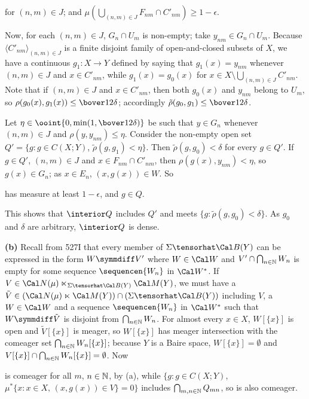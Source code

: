 {

\noindent for $(n,m)\in J$; and
$\mu(\bigcup_{(n,m)\in J}F_{nm}\cap C'_{nm})\ge 1-\epsilon$.

Now, for each $(n,m)\in J$, $G_n\cap U_m$ is non-empty;  take
$y_{nm}\in G_n\cap U_m$.
Because $\langle C'_{nm}\rangle_{(n,m)\in J}$ is a finite disjoint family of
open-and-closed subsets of $X$, we have a continuous $g_1:X\to Y$ defined by saying
that $g_1(x)=y_{nm}$ whenever $(n,m)\in J$ and $x\in C'_{nm}$, while $g_1(x)=g_0(x)$
for $x\in X\setminus\bigcup_{(n,m)\in J}C'_{nm}$.   Note that if $(n,m)\in J$ and
$x\in C'_{nm}$, then both $g_0(x)$ and $y_{nm}$ belong to $U_m$, so
$\rho(g_0(x),g_1(x))\le\bover12\delta$;  accordingly
$\tilde\rho(g_0,g_1)\le\bover12\delta$.

Let $\eta\in\ooint{0,\min(1,\bover12\delta)}$ be such that
$y\in G_n$ whenever
$(n,m)\in J$ and $\rho(y,y_{nm})\le\eta$.   Consider the non-empty
open set $Q'=\{g:g\in C(X;Y)$, $\tilde\rho(g,g_1)<\eta\}$.
Then $\tilde\rho(g,g_0)<\delta$ for every $g\in Q'$.
If $g\in Q'$, $(n,m)\in J$ and $x\in F_{nm}\cap C'_{nm}$, then
$\rho(g(x),y_{nm})<\eta$, so $g(x)\in G_n$;  as $x\in E_n$, $(x,g(x))\in W$.
So


\noindent has measure at least $1-\epsilon$, and $g\in Q$.

This shows that $\interior Q$ includes $Q'$ and meets
$\{g:\tilde\rho(g,g_0)<\delta\}$.   As $g_0$ and $\delta$ are arbitrary, $\interior Q$
is dense.\ \Qed

\medskip

{\bf (b)} Recall from 527I that every member of
$\Sigma\tensorhat\Cal B(Y)$ can be
expressed in the form $W\symmdiff V'$ where $W\in\Cal W$ and
$V'\cap\bigcap_{n\in\Bbb N}W_n$ is empty for some sequence
$\sequencen{W_n}$ in $\Cal W^*$.   If
$V\in\Cal N(\mu)\ltimes_{\Sigma\tensorhat\Cal B(Y)}\Cal M(Y)$, we must have
a $\tilde V\in(\Cal N(\mu)\ltimes\Cal M(Y))\cap(\Sigma\tensorhat\Cal B(Y))$
including $V$, a $W\in\Cal W$ and a sequence $\sequencen{W_n}$ in
$\Cal W^*$ such that
$W\symmdiff\tilde V$ is disjoint from $\bigcap_{n\in\Bbb N}W_n$.   For
almost
every $x\in X$, $W[\{x\}]$ is open and $\tilde V[\{x\}]$ is meager, so
$W[\{x\}]$ has meager intersection with the comeager set
$\bigcap_{n\in\Bbb N}W_n[\{x\}]$;  because $Y$ is a Baire space,
$W[\{x\}]=\emptyset$ and
$V[\{x\}]\cap\bigcap_{n\in\Bbb N}W_n[\{x\}]=\emptyset$.   Now


\noindent is comeager for all $m$, $n\in\Bbb N$, by (a), while
$\{g:g\in C(X;Y)$, $\mu^*\{x:x\in X,\,(x,g(x))\in V\}=0\}$ includes
$\bigcap_{m,n\in\Bbb N}Q_{mn}$, so is also comeager.
}%

